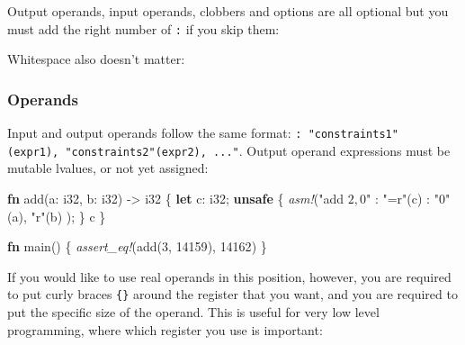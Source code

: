 \documentclass[a4paper,]{book}
\newenvironment{Shaded}{\begin{snugshade}}{\end{snugshade}}
\newcommand{\KeywordTok}[1]{\textcolor[rgb]{0.13,0.29,0.53}{\textbf{{#1}}}}
\newcommand{\DataTypeTok}[1]{\textcolor[rgb]{0.13,0.29,0.53}{{#1}}}
\newcommand{\DecValTok}[1]{\textcolor[rgb]{0.00,0.00,0.81}{{#1}}}
\newcommand{\StringTok}[1]{\textcolor[rgb]{0.31,0.60,0.02}{{#1}}}
\newcommand{\PreprocessorTok}[1]{\textcolor[rgb]{0.56,0.35,0.01}{\textit{{#1}}}}
\newcommand{\NormalTok}[1]{{#1}}
\begin{document}
Output operands, input operands, clobbers and options are all optional
but you must add the right number of \texttt{:} if you skip them:

\begin{Shaded}
\end{Shaded}

Whitespace also doesn't matter:

\begin{Shaded}
\end{Shaded}

\subsubsection{Operands}\label{operands}

Input and output operands follow the same format:
\texttt{:\ "constraints1"(expr1),\ "constraints2"(expr2),\ ..."}. Output
operand expressions must be mutable lvalues, or not yet assigned:

\begin{Shaded}
\begin{Highlighting}[]
\KeywordTok{fn} \NormalTok{add(a: }\DataTypeTok{i32}\NormalTok{, b: }\DataTypeTok{i32}\NormalTok{) -> }\DataTypeTok{i32} \NormalTok{\{}
    \KeywordTok{let} \NormalTok{c: }\DataTypeTok{i32}\NormalTok{;}
    \KeywordTok{unsafe} \NormalTok{\{}
        \PreprocessorTok{asm!}\NormalTok{(}\StringTok{"add $2, $0"}
             \NormalTok{: }\StringTok{"=r"}\NormalTok{(c)}
             \NormalTok{: }\StringTok{"0"}\NormalTok{(a), }\StringTok{"r"}\NormalTok{(b)}
             \NormalTok{);}
    \NormalTok{\}}
    \NormalTok{c}
\NormalTok{\}}

\KeywordTok{fn} \NormalTok{main() \{}
    \PreprocessorTok{assert_eq!}\NormalTok{(add(}\DecValTok{3}\NormalTok{, }\DecValTok{14159}\NormalTok{), }\DecValTok{14162}\NormalTok{)}
\NormalTok{\}}
\end{Highlighting}
\end{Shaded}

If you would like to use real operands in this position, however, you
are required to put curly braces \texttt{\{\}} around the register that
you want, and you are required to put the specific size of the operand.
This is useful for very low level programming, where which register you
use is important:
\end{document}
